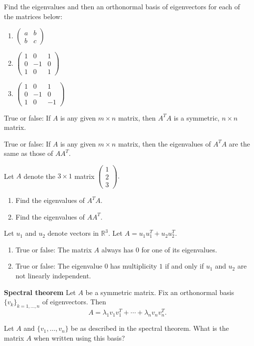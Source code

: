 \begin{enumerate}
\Problem Find the eigenvalues and then an orthonormal basis of eigenvectors for each of the matrices below:
\begin{enumerate}
    \item[a)] 
    $
    \begin{pmatrix}
    a & b \\
    b & c
    \end{pmatrix}
    $\vfill
    \item[b)] 
    $
    \begin{pmatrix}
    1 & 0 & 1 \\
    0 & -1 & 0 \\
    1 & 0 & 1
    \end{pmatrix}
    $\vfill
    \item[c)] 
    $
    \begin{pmatrix}
    1 & 0 & 1 \\
    0 & -1 & 0 \\
    1 & 0 & -1
    \end{pmatrix}
   $\vfill
\end{enumerate}


\newpage

\Problem True or false: If $A$ is any given $m \times n$ matrix, then $A^TA$ is a symmetric, $n \times n$ matrix.
\vfill

\Problem
True or false: If $A$ is any given $m \times n$ matrix, then the eigenvalues of $A^TA$ are the same as those of $AA^T.$
\vfill

\Problem
Let $A$ denote the $3 \times 1$ matrix
$
\begin{pmatrix}
1 \\
2 \\
3
\end{pmatrix}.
$
\begin{enumerate}
    \item[a)] Find the eigenvalues of $A^TA.$\vfill
    \item[b)] Find the eigenvalues of $AA^T.$
\end{enumerate}

\vfill

\newpage
\Problem
Let $u_1$ and $u_2$ denote vectors in $\mathbb{R}^3.$ Let $A = u_1u_1^T + u_2u_2^T.$

\begin{enumerate}
    \item[a)] True or false: The matrix $A$ always has $0$ for one of its eigenvalues.\vfill
    \item[b)] True or false: The eigenvalue $0$ has multiplicity $1$ if and only if $u_1$ and $u_2$ are not linearly independent.\vfill
\end{enumerate}

\Problem \textbf{Spectral theorem}
Let $A$ be a symmetric matrix. Fix an orthonormal basis $\{v_k\}_{k=1,\dots,n}$ of eigenvectors. Then
\[
A = \lambda_1 v_1v_1^T + \cdots + \lambda_nv_nv_n^T.
\]

Let $A$ and $\{v_1, \dots, v_n\}$ be as described in the spectral theorem. What is the matrix $A$ when written using this basis?
\vfill

\end{enumerate}


